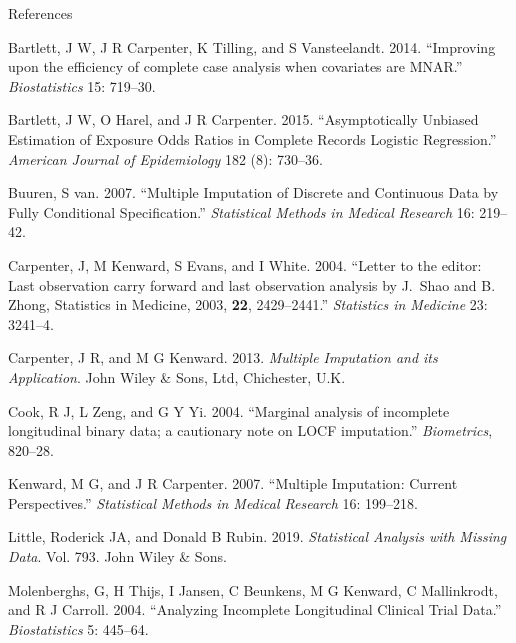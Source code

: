 \documentclass[ignorenonframetext,]{beamer}
\begin{document}
\begin{frame}[allowframebreaks]{References}
\protect\hypertarget{references}{}

\hypertarget{refs}{}
\leavevmode\hypertarget{ref-Bartlett2014a}{}%
Bartlett, J W, J R Carpenter, K Tilling, and S Vansteelandt. 2014.
``Improving upon the efficiency of complete case analysis when
covariates are MNAR.'' \emph{Biostatistics} 15: 719--30.

\leavevmode\hypertarget{ref-Bartlett2015}{}%
Bartlett, J W, O Harel, and J R Carpenter. 2015. ``Asymptotically
Unbiased Estimation of Exposure Odds Ratios in Complete Records Logistic
Regression.'' \emph{American Journal of Epidemiology} 182 (8): 730--36.

\leavevmode\hypertarget{ref-Buuren:2007}{}%
Buuren, S van. 2007. ``Multiple Imputation of Discrete and Continuous
Data by Fully Conditional Specification.'' \emph{Statistical Methods in
Medical Research} 16: 219--42.

\leavevmode\hypertarget{ref-Carpenterux2fKenwardux2fEvansux2fWhite:2004}{}%
Carpenter, J, M Kenward, S Evans, and I White. 2004. ``Letter to the
editor: Last observation carry forward and last observation analysis by
J.~Shao and B. Zhong, Statistics in Medicine, 2003, \textbf{22},
2429--2441.'' \emph{Statistics in Medicine} 23: 3241--4.

\leavevmode\hypertarget{ref-CarpenterKenward2013}{}%
Carpenter, J R, and M G Kenward. 2013. \emph{Multiple Imputation and its
Application}. John Wiley \& Sons, Ltd, Chichester, U.K.

\leavevmode\hypertarget{ref-Cookux2fZengux2fYi:2004}{}%
Cook, R J, L Zeng, and G Y Yi. 2004. ``Marginal analysis of incomplete
longitudinal binary data; a cautionary note on LOCF imputation.''
\emph{Biometrics}, 820--28.

\leavevmode\hypertarget{ref-Kenwardux2fCarpenter:2007}{}%
Kenward, M G, and J R Carpenter. 2007. ``Multiple Imputation: Current
Perspectives.'' \emph{Statistical Methods in Medical Research} 16:
199--218.

\leavevmode\hypertarget{ref-little2019statistical}{}%
Little, Roderick JA, and Donald B Rubin. 2019. \emph{Statistical
Analysis with Missing Data}. Vol. 793. John Wiley \& Sons.

\leavevmode\hypertarget{ref-Molenberghsux2fThijs:2004}{}%
Molenberghs, G, H Thijs, I Jansen, C Beunkens, M G Kenward, C
Mallinkrodt, and R J Carroll. 2004. ``Analyzing Incomplete Longitudinal
Clinical Trial Data.'' \emph{Biostatistics} 5: 445--64.


\end{frame}
\end{document}
